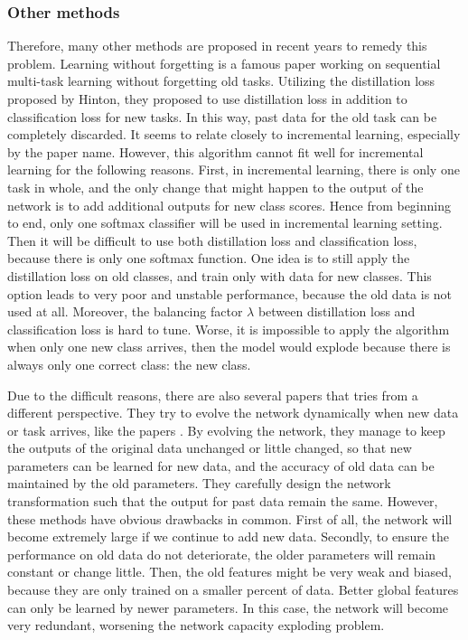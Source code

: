 \subsubsection{Other methods}
Therefore, many other methods are proposed in recent years to remedy this problem. Learning without forgetting\cite{li2017learning} is a famous paper working on sequential multi-task learning without forgetting old tasks.
Utilizing the distillation loss proposed by Hinton\cite{hinton2015distilling}, they proposed to use distillation loss in addition to classification loss for new tasks. In this way, past data for the old task can be completely discarded. It seems to relate closely to incremental learning, especially by the paper name. However, this algorithm cannot fit well for incremental learning for the following reasons. First, in incremental learning, there is only one task in whole, and the only change that might happen to the output of the network is to add additional outputs for new class scores. Hence from beginning to end, only one softmax classifier will be used in incremental learning setting. Then it will be difficult to use both distillation loss and classification loss, because there is only one softmax function. One idea is to still apply the distillation loss on old classes, and train only with data for new classes. This option leads to very poor and unstable performance, because the old data is not used at all. Moreover, the balancing factor $\lambda$ between distillation loss and classification loss is hard to tune. Worse, it is impossible to apply the algorithm when only one new class arrives, then the model would explode because there is always only one correct class: the new class.

Due to the difficult reasons, there are also several papers that tries from a different perspective. They try to evolve the network dynamically when new data or task arrives, like the papers \parencite{yoon2017lifelong,rosenfeld2017incremental,sarwar2017incremental,rusu2016progressive}. By evolving the network, they manage to keep the outputs of the original data unchanged or little changed, so that new parameters can be learned for new data, and the accuracy of old data can be maintained by the old parameters. They carefully design the network transformation such that the output for past data remain the same. However, these methods have obvious drawbacks in common. First of all, the network will become extremely large if we continue to add new data. Secondly, to ensure the performance on old data do not deteriorate, the older parameters will remain constant or change little. Then, the old features might be very weak and biased, because they are only trained on a smaller percent of data. Better global features can only be learned by newer parameters. In this case, the network will become very redundant, worsening the network capacity exploding problem.


